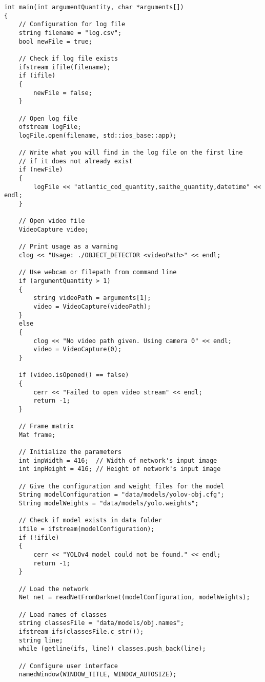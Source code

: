 \begin{verbatim}
int main(int argumentQuantity, char *arguments[])
{
    // Configuration for log file
    string filename = "log.csv";
    bool newFile = true;

    // Check if log file exists
    ifstream ifile(filename);
    if (ifile)
    {
        newFile = false;
    }

    // Open log file
    ofstream logFile;
    logFile.open(filename, std::ios_base::app);

    // Write what you will find in the log file on the first line
    // if it does not already exist
    if (newFile)
    {
        logFile << "atlantic_cod_quantity,saithe_quantity,datetime" << endl;
    }

    // Open video file
    VideoCapture video;

    // Print usage as a warning
    clog << "Usage: ./OBJECT_DETECTOR <videoPath>" << endl;

    // Use webcam or filepath from command line
    if (argumentQuantity > 1)
    {
        string videoPath = arguments[1];
        video = VideoCapture(videoPath);
    }
    else
    {
        clog << "No video path given. Using camera 0" << endl;
        video = VideoCapture(0);
    }

    if (video.isOpened() == false)
    {
        cerr << "Failed to open video stream" << endl;
        return -1;
    }

    // Frame matrix
    Mat frame;

    // Initialize the parameters
    int inpWidth = 416;  // Width of network's input image
    int inpHeight = 416; // Height of network's input image

    // Give the configuration and weight files for the model
    String modelConfiguration = "data/models/yolov-obj.cfg";
    String modelWeights = "data/models/yolo.weights";

    // Check if model exists in data folder
    ifile = ifstream(modelConfiguration);
    if (!ifile)
    {
        cerr << "YOLOv4 model could not be found." << endl;
        return -1;
    }

    // Load the network
    Net net = readNetFromDarknet(modelConfiguration, modelWeights);

    // Load names of classes
    string classesFile = "data/models/obj.names";
    ifstream ifs(classesFile.c_str());
    string line;
    while (getline(ifs, line)) classes.push_back(line);

    // Configure user interface
    namedWindow(WINDOW_TITLE, WINDOW_AUTOSIZE);
\end{verbatim}

